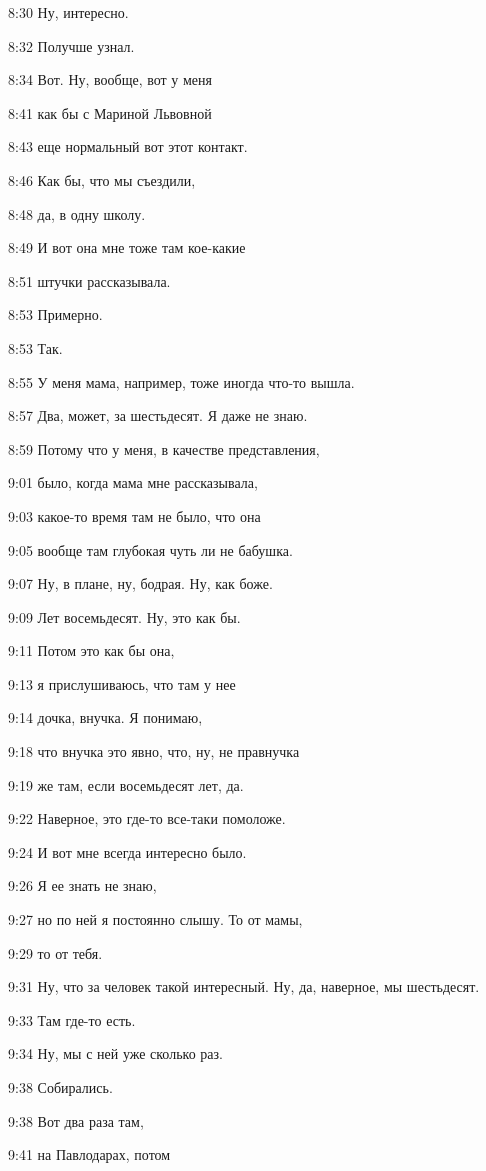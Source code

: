 8:30
Ну, интересно.

8:32
Получше узнал.

8:34
Вот. Ну, вообще, вот у меня

8:41
как бы с Мариной Львовной

8:43
еще нормальный вот этот контакт.

8:46
Как бы, что мы съездили,

8:48
да, в одну школу.

8:49
И вот она мне тоже там кое-какие

8:51
штучки рассказывала.

8:53
Примерно.

8:53
Так.

8:55
У меня мама, например, тоже иногда что-то вышла.

8:57
Два, может, за шестьдесят. Я даже не знаю.

8:59
Потому что у меня, в качестве представления,

9:01
было, когда мама мне рассказывала,

9:03
какое-то время там не было, что она

9:05
вообще там глубокая чуть ли не бабушка.

9:07
Ну, в плане, ну, бодрая. Ну, как боже.

9:09
Лет восемьдесят. Ну, это как бы.

9:11
Потом это как бы она,

9:13
я прислушиваюсь, что там у нее

9:14
дочка, внучка. Я понимаю,

9:18
что внучка это явно, что, ну, не правнучка

9:19
же там, если восемьдесят лет, да.

9:22
Наверное, это где-то все-таки помоложе.

9:24
И вот мне всегда интересно было.

9:26
Я ее знать не знаю,

9:27
но по ней я постоянно слышу. То от мамы,

9:29
то от тебя.

9:31
Ну, что за человек такой интересный. Ну, да, наверное, мы шестьдесят.

9:33
Там где-то есть.

9:34
Ну, мы с ней уже сколько раз.

9:38
Собирались.

9:38
Вот два раза там,

9:41
на Павлодарах, потом


